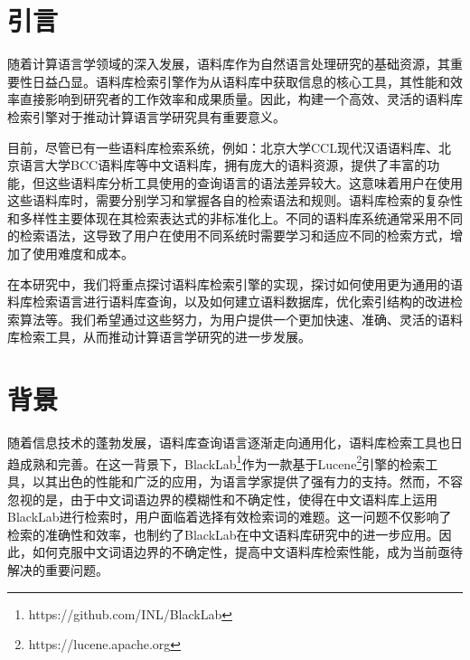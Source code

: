 \documentclass[11pt]{article}
\begin{document}
\begin{CJK*}{UTF8}{gbsn}
\section{引言}
\label{intro}

随着计算语言学领域的深入发展，语料库作为自然语言处理研究的基础资源，其重要性日益凸显。语料库检索引擎作为从语料库中获取信息的核心工具，其性能和效率直接影响到研究者的工作效率和成果质量。因此，构建一个高效、灵活的语料库检索引擎对于推动计算语言学研究具有重要意义。

目前，尽管已有一些语料库检索系统，例如：北京大学CCL现代汉语语料库\cite{ccl}、北京语言大学BCC语料库等中文语料库\cite{bcc}，拥有庞大的语料资源，提供了丰富的功能，但这些语料库分析工具使用的查询语言的语法差异较大\cite{zhangyongwei}。这意味着用户在使用这些语料库时，需要分别学习和掌握各自的检索语法和规则。语料库检索的复杂性和多样性主要体现在其检索表达式的非标准化上。不同的语料库系统通常采用不同的检索语法，这导致了用户在使用不同系统时需要学习和适应不同的检索方式，增加了使用难度和成本。


在本研究中，我们将重点探讨语料库检索引擎的实现，探讨如何使用更为通用的语料库检索语言进行语料库查询，以及如何建立语料数据库，优化索引结构的改进检索算法等。我们希望通过这些努力，为用户提供一个更加快速、准确、灵活的语料库检索工具，从而推动计算语言学研究的进一步发展。

%
%

\section{背景}
\label{backgound}

随着信息技术的蓬勃发展，语料库查询语言逐渐走向通用化，语料库检索工具也日趋成熟和完善。在这一背景下，BlackLab\footnote[1]{https://github.com/INL/BlackLab}作为一款基于Lucene\footnote[2]{https://lucene.apache.org}引擎的检索工具，以其出色的性能和广泛的应用，为语言学家提供了强有力的支持。然而，不容忽视的是，由于中文词语边界的模糊性和不确定性，使得在中文语料库上运用BlackLab进行检索时，用户面临着选择有效检索词的难题。这一问题不仅影响了检索的准确性和效率，也制约了BlackLab在中文语料库研究中的进一步应用。因此，如何克服中文词语边界的不确定性，提高中文语料库检索性能，成为当前亟待解决的重要问题。


\end{CJK*}
\end{document}
